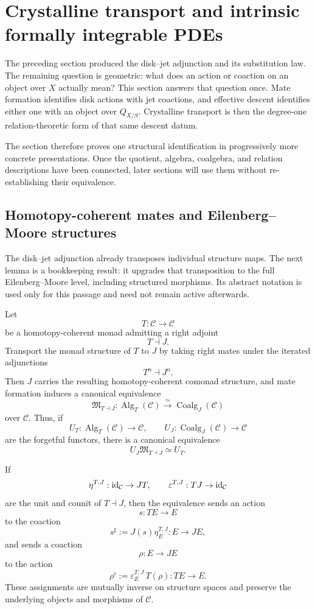 \section{Crystalline transport and intrinsic formally integrable PDEs}
\label{sec:jets-descent-pde}

The preceding section produced the disk--jet adjunction and its substitution
law. The remaining question is geometric: what does an action or coaction on an
object over \(X\) actually mean? This section answers that question once. Mate
formation identifies disk actions with jet coactions, and effective descent
identifies either one with an object over \(Q_{X/S}\). Crystalline transport is
then the degree-one relation-theoretic form of that same descent datum.

The section therefore proves one structural identification in progressively
more concrete presentations. Once the quotient, algebra, coalgebra, and
relation descriptions have been connected, later sections will use them
without re-establishing their equivalence.

\subsection{Homotopy-coherent mates and Eilenberg--Moore structures}

The disk--jet adjunction already transposes individual structure maps. The next
lemma is a bookkeeping result: it upgrades that transposition to the full
Eilenberg--Moore level, including structured morphisms. Its abstract notation
is used only for this passage and need not remain active afterwards.

\begin{lemma}
\label{lem:homotopy-coherent-adjoint-monad-duality}
Let
\[
  T:\mathcal C\to\mathcal C
\]
be a homotopy-coherent monad admitting a right adjoint
\[
  T\dashv J.
\]
Transport the monad structure of \(T\) to \(J\) by taking right mates under the
iterated adjunctions
\[
  T^n\dashv J^n.
\]
Then \(J\) carries the resulting homotopy-coherent comonad structure, and mate
formation induces a canonical equivalence
\[
  \mathfrak M_{T\dashv J}:
  \operatorname{Alg}_T(\mathcal C)
  \xrightarrow{\simeq}
  \operatorname{Coalg}_J(\mathcal C)
\]
over \(\mathcal C\). Thus, if
\[
  U_T:\operatorname{Alg}_T(\mathcal C)\to\mathcal C,
  \qquad
  U_J:\operatorname{Coalg}_J(\mathcal C)\to\mathcal C
\]
are the forgetful functors, there is a canonical equivalence
\[
  U_J\mathfrak M_{T\dashv J}\simeq U_T.
\]

If
\[
  \eta^{T,J}:\operatorname{id}_{\mathcal C}\to JT,
  \qquad
  \varepsilon^{T,J}:TJ\to\operatorname{id}_{\mathcal C}
\]
are the unit and counit of \(T\dashv J\), then the equivalence sends an action
\[
  s:TE\to E
\]
to the coaction
\[
  s^\sharp
  :=
  J(s)\eta^{T,J}_E:
  E\to JE,
\]
and sends a coaction
\[
  \rho:E\to JE
\]
to the action
\[
  \rho^\flat
  :=
  \varepsilon^{T,J}_E\,T(\rho):
  TE\to E.
\]
These assignments are mutually inverse on structure spaces and preserve the
underlying objects and morphisms of \(\mathcal C\).
\end{lemma}

